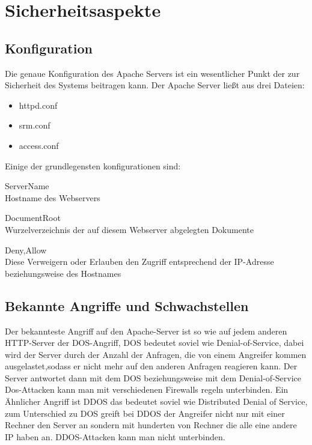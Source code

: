 \newpage


\section{Sicherheitsaspekte}

\subsection{Konfiguration}
Die genaue Konfiguration des Apache Servers ist ein wesentlicher Punkt der zur Sicherheit des Systems beitragen kann. Der Apache Server ließt aus drei Dateien:
\begin{itemize}
\item{httpd.conf}
\item{srm.conf}
\item{access.conf}
\end{itemize}
Einige der grundlegensten konfigurationen sind:
\begin{description}
\item{ServerName \\ Hostname des Webservers}
\item{DocumentRoot \\ Wurzelverzeichnis der auf diesem Webserver abgelegten 
Dokumente }
\item{Deny,Allow \\ Diese Verweigern oder Erlauben den Zugriff entsprechend der IP-Adresse beziehungsweise des Hostnames }
\end{description} 

\subsection{Bekannte Angriffe und Schwachstellen}
Der bekannteste Angriff auf den Apache-Server ist so wie auf jedem anderen HTTP-Server der DOS-Angriff, DOS bedeutet soviel wie Denial-of-Service, dabei wird der Server durch der Anzahl der Anfragen, die von einem Angreifer kommen ausgelastet,sodass er nicht mehr auf den anderen Anfragen reagieren kann. Der Server antwortet dann mit dem DOS beziehungsweise mit dem Denial-of-Service Dos-Attacken kann man mit verschiedenen Firewalls regeln unterbinden. Ein Ähnlicher Angriff ist DDOS das bedeutet soviel wie Distributed Denial of Service, zum Unterschied zu DOS greift bei DDOS der Angreifer nicht nur mit einer Rechner den Server an sondern mit hunderten von Rechner die alle eine andere IP haben an. DDOS-Attacken kann man nicht unterbinden.
